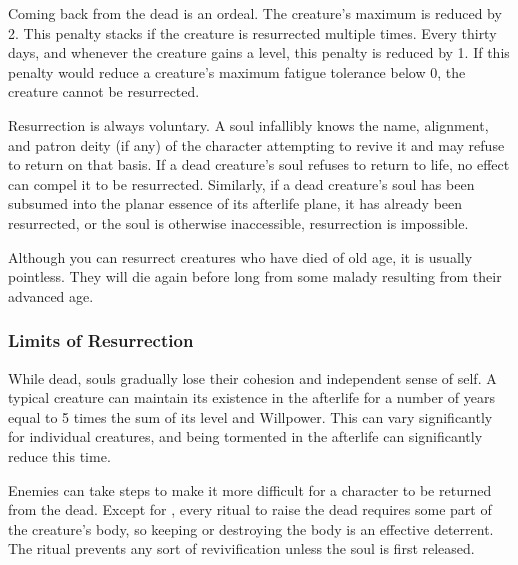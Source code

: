     Coming back from the dead is an ordeal.
    The creature's maximum  is reduced by 2.
    This penalty stacks if the creature is resurrected multiple times.
    Every thirty days, and whenever the creature gains a level, this penalty is reduced by 1.
    If this penalty would reduce a creature's maximum fatigue tolerance below 0, the creature cannot be resurrected.

    Resurrection is always voluntary.
    A soul infallibly knows the name, alignment, and patron deity (if any) of the character attempting to revive it and may refuse to return on that basis.
    If a dead creature's soul refuses to return to life, no effect can compel it to be resurrected.
    Similarly, if a dead creature's soul has been subsumed into the planar essence of its afterlife plane, it has already been resurrected, or the soul is otherwise inaccessible, resurrection is impossible.

    Although you can resurrect creatures who have died of old age, it is usually pointless.
    They will die again before long from some malady resulting from their advanced age.

    \subsubsection{Limits of Resurrection}
      While dead, souls gradually lose their cohesion and independent sense of self.
      A typical creature can maintain its existence in the afterlife for a number of years equal to 5 times the sum of its level and Willpower.
      This can vary significantly for individual creatures, and being tormented in the afterlife can significantly reduce this time.

      Enemies can take steps to make it more difficult for a character to be returned from the dead.
      Except for , every ritual to raise the dead requires some part of the creature's body, so keeping or destroying the body is an effective deterrent.
      The  ritual prevents any sort of revivification unless the soul is first released.

